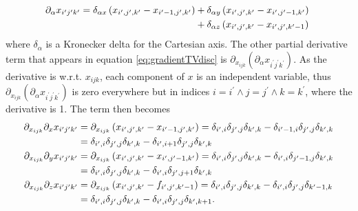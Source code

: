 \begin{align}
\partial_\alpha x_{i^\prime j^\prime k^\prime}=\delta_{\alpha x} \left(x_{i^\prime,j^\prime,k^\prime}-x_{i^\prime-1, j^\prime, k^\prime}\right)&+ \delta_{\alpha y} \left(x_{i^\prime,j^\prime,k^\prime}-x_{i^\prime, j^\prime-1, k^\prime}\right)  \notag \\ &+ \delta_{\alpha z} \left(x_{i^\prime,j^\prime,k^\prime}-x_{i^\prime ,j^\prime, k^\prime-1}\right)\
\end{align}
 where $\delta_\alpha$ is a Kronecker delta for the Cartesian axis. The other partial derivative term that appears in equation \ref{eq:gradientTVdisc} is $\partial_{x_{ijk}} \left(\partial_\alpha x_{i^\prime j^\prime k^\prime}\right)$. As the derivative is w.r.t. $x_{ijk}$, each component of $x$ is an independent variable, thus $\partial_{x_{ijk}} \left(\partial_\alpha x_{i^\prime j^\prime k^\prime}\right)$ is zero everywhere but in indices $i=i^\prime \wedge j=j^\prime \wedge k=k^\prime$, where the derivative is 1. The term then becomes 
 \begin{align}
\partial_{x_{ijk}} \partial_x x_{i^\prime j^\prime k^\prime}&=\partial_{x_{ijk}}\left(x_{i^\prime,j^\prime,k^\prime}-x_{i^\prime-1, j^\prime, k^\prime}\right)=\delta_{i^\prime,i}\delta_{j^\prime,j}\delta_{k^\prime,k} - \delta_{i^\prime-1,i}\delta_{j^\prime,j}\delta_{k^\prime,k}\nonumber\\
&=\delta_{i^\prime,i}\delta_{j^\prime,j}\delta_{k^\prime,k} - \delta_{i^\prime,i+1}\delta_{j^\prime,j}\delta_{k^\prime,k}\nonumber\\
%
\partial_{x_{ijk}} \partial_y x_{i^\prime j^\prime k^\prime}&=\partial_{x_{ijk}} \left(x_{i^\prime,j^\prime,k^\prime}-x_{i^\prime, j^\prime-1, k^\prime}\right)=\delta_{i^\prime,i}\delta_{j^\prime,j}\delta_{k^\prime,k} - \delta_{i^\prime,i}\delta_{j^\prime-1,j}\delta_{k^\prime,k}\notag\\
&=\delta_{i^\prime,i}\delta_{j^\prime,j}\delta_{k^\prime,k} - \delta_{i^\prime,i}\delta_{j^\prime,j+1}\delta_{k^\prime,k}\nonumber\\
%
\partial_{x_{ijk}} \partial_z x_{i^\prime j^\prime k^\prime}&=\partial_{x_{ijk}} \left(x_{i^\prime,j^\prime,k^\prime}-f_{i^\prime, j^\prime, k^\prime-1}\right)=\delta_{i^\prime,i}\delta_{j^\prime,j}\delta_{k^\prime,k} - \delta_{i^\prime,i}\delta_{j^\prime,j}\delta_{k^\prime-1,k}\notag\\
&=\delta_{i^\prime,i}\delta_{j^\prime,j}\delta_{k^\prime,k} - \delta_{i^\prime,i}\delta_{j^\prime,j}\delta_{k^\prime,k+1}.
\end{align}


